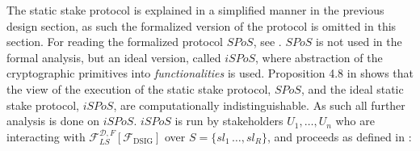 The static stake protocol is explained in a simplified manner in the previous design section, as such the formalized version of the protocol is omitted in this section. For reading the formalized protocol $SPoS$, see \cite{ouroboros}. $SPoS$ is not used in the formal analysis, but an ideal version, called $iSPoS$, where abstraction of the cryptographic primitives into \emph{functionalities} is used. Proposition 4.8 in \cite{ouroboros} shows that the view of the execution of the static stake protocol, $SPoS$, and the ideal static stake protocol, $iSPoS$, are computationally indistinguishable. As such all further analysis is done on $iSPoS$. $iSPoS$ is run by stakeholders $U_1,\dots,U_n$ who are interacting with $\mathcal{F}_{LS}^{\mathcal{D},F}[\mathcal{F}_\text{DSIG}]$ over $S=\{sl_1\,\dots,sl_R\}$, and proceeds as defined in \cite{ouroboros}:
